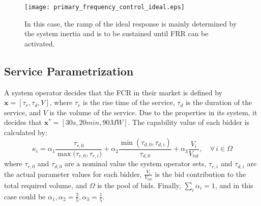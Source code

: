 \begin{figure}[htbp!]
\centering
\texttt{[image: primary\_frequency\_control\_ideal.eps]}
\caption{In this case, the ramp of the ideal response is mainly determined by the system inertia and is to be sustained until FRR can be activated.}
\label{fig:idealresponse}
\end{figure}

\subsection*{Service Parametrization}
A system operator decides that the FCR in their market is defined by $\textbf{x} = [\tau_r,\tau_d,V]$, where $\tau_r$ is the rise time of the service, $\tau_d$ is the duration of the service, and $V$ is the volume of the service. Due to the properties in its system, it decides that $\textbf{x}^* = [30 s, 20 min, 90 MW]$. The capability value of each bidder is calculated by:
\begin{equation}
	\kappa_i = \alpha_1 \frac{\tau_{r,0}}{\max({\tau_{r,0},\tau_{r,i})}} + \alpha_2  \frac{\min(\tau_{d,0},\tau_{d,i})}{\tau_{d,0}} + \alpha_3 \frac{V_i}{V_{tot}}, \quad \forall \, i \in \Omega \label{eq:kappa_primfreq}
\end{equation}
where $\tau_{r,0}$ and $\tau_{d,0}$ are a nominal value the system operator sets, $\tau_{r,i}$ and $\tau_{d,i}$ are the actual parameter values for each bidder, $\frac{V_i}{V_{tot}}$ is the bid contribution to the total required volume, and $\Omega$ is the pool of bids. Finally, $\sum_{i} \alpha_i = 1$, and in this case could be $\alpha_1,\alpha_2 = \frac{2}{5}, \alpha_3 = \frac{1}{5}$.


